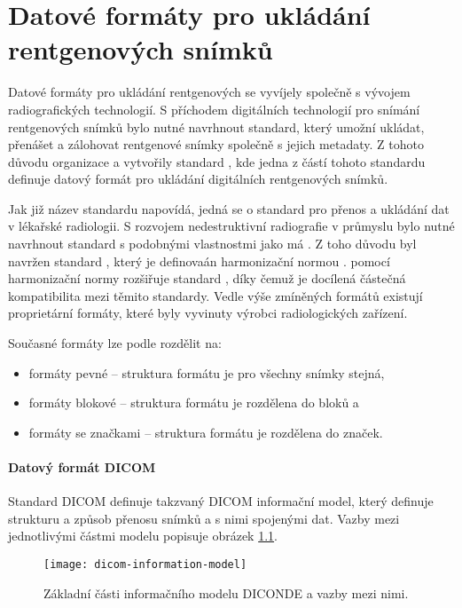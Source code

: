 \chapter{Datové formáty pro ukládání rentgenových snímků}
Datové formáty pro ukládání rentgenových se vyvíjely společně s vývojem radiografických technologií. S příchodem digitálních technologií pro snímání rentgenových snímků bylo nutné navrhnout standard, který umožní ukládat, přenášet a zálohovat rentgenové snímky společně s jejich metadaty. Z tohoto důvodu organizace  a  vytvořily standard  \cite{dicom-standard}, kde jedna z částí tohoto standardu definuje datový formát pro ukládání digitálních rentgenových snímků. 

Jak již název standardu napovídá, jedná se o standard pro přenos a ukládání dat v lékařské radiologii. S rozvojem nedestruktivní radiografie v průmyslu bylo nutné navrhnout standard s podobnými vlastnostmi jako má . Z toho důvodu byl navržen standard , který je definovaán harmonizační normou \cite{diconde-standard}.  pomocí harmonizační normy rozšiřuje standard , díky čemuž je docílená částečná kompatibilita mezi těmito standardy. Vedle výše zmíněných formátů existují proprietární formáty, které byly vyvinuty výrobci radiologických zařízení. 

Současné formáty lze podle \cite{blabla} rozdělit na:
\begin{itemize}
\item formáty pevné -- struktura formátu je pro všechny snímky stejná,
\item formáty blokové -- struktura formátu je rozdělena do bloků a 
\item formáty se značkami -- struktura formátu je rozdělena do značek. 
\end{itemize}

\subsubsection{Datový formát DICOM}
Standard DICOM definuje takzvaný DICOM informační model, který definuje strukturu a způsob přenosu snímků a s nimi spojenými dat. Vazby mezi jednotlivými částmi modelu popisuje obrázek \ref{fig:dicom-information-model}.

\begin{figure}[htb]
\centering
\texttt{[image: dicom-information-model]}
\caption{Základní části informačního modelu DICONDE a vazby mezi nimi. \cite{dicom-standard}}
\label{fig:dicom-information-model}
\end{figure}

